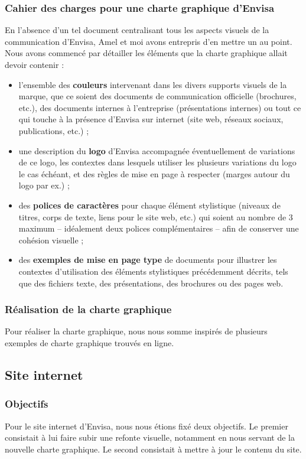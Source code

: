 \documentclass[a4paper,12pt,twoside]{article}
\begin{document}
    \subsubsection{Cahier des charges pour une charte graphique d'Envisa}
    En l'absence d'un tel document centralisant tous les aspects visuels de la communication d'Envisa, Amel et moi avons entrepris d'en mettre un au point.  Nous avons commencé par détailler les éléments que la charte graphique allait devoir contenir :
    \begin{itemize}
    	\item l'ensemble des \textbf{couleurs} intervenant dans les divers supports visuels de la marque, que ce soient des documents de communication officielle (brochures, etc.), des documents internes à l'entreprise (présentations internes) ou tout ce qui touche à la présence d'Envisa sur internet (site web, réseaux sociaux, publications, etc.) ;
    	\item une description du \textbf{logo} d'Envisa accompagnée éventuellement de variations de ce logo, les contextes dans lesquels utiliser les plusieurs variations du logo le cas échéant, et des règles de mise en page à respecter (marges autour du logo par ex.) ;
    	\item des \textbf{polices de caractères} pour chaque élément stylistique (niveaux de titres, corps de texte, liens pour le site web, etc.) qui soient au nombre de 3 maximum -- idéalement deux polices complémentaires -- afin de conserver une cohésion visuelle ;
    	\item des \textbf{exemples de mise en page type}  de documents pour illustrer les contextes d'utilisation des éléments stylistiques précédemment décrits, tels que des fichiers texte, des présentations, des brochures ou des pages web.
    \end{itemize}
    \subsubsection{Réalisation de la charte graphique}
    Pour réaliser la charte graphique, nous nous somme inspirés de plusieurs exemples de charte graphique trouvés en ligne.
    
    \subsection{Site internet}
    \subsubsection{Objectifs}
    Pour le site internet d'Envisa, nous nous étions fixé deux objectifs. Le premier consistait à lui faire subir une refonte visuelle, notamment en nous servant de la nouvelle charte graphique. Le second consistait à mettre à jour le contenu du site.
\end{document}
